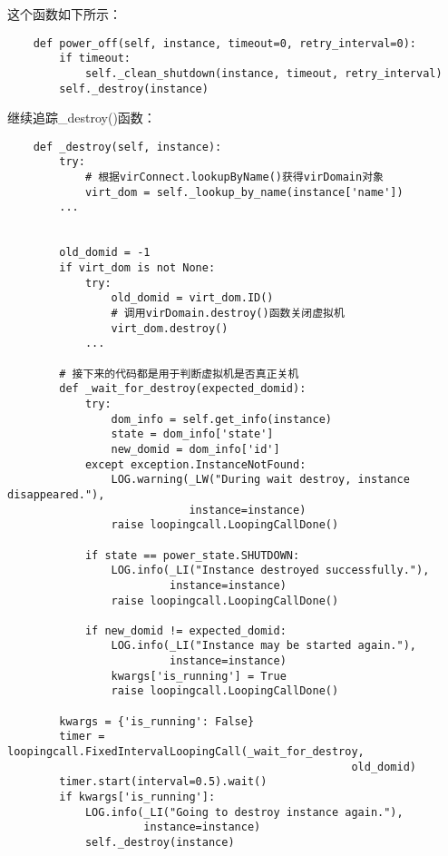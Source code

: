 \documentclass[a4paper,left=1.5cm,right=1.5cm,11pt]{article}
\begin{document}
	这个函数如下所示：
	\begin{lstlisting}
	def power_off(self, instance, timeout=0, retry_interval=0):
        if timeout:
            self._clean_shutdown(instance, timeout, retry_interval)
        self._destroy(instance)
	\end{lstlisting}

	继续追踪\_destroy()函数：
	\begin{lstlisting}
	def _destroy(self, instance):
        try:
			# 根据virConnect.lookupByName()获得virDomain对象
            virt_dom = self._lookup_by_name(instance['name'])
        ...

        
        old_domid = -1
        if virt_dom is not None:
            try:
                old_domid = virt_dom.ID()
				# 调用virDomain.destroy()函数关闭虚拟机
                virt_dom.destroy()
            ...
		
		# 接下来的代码都是用于判断虚拟机是否真正关机
        def _wait_for_destroy(expected_domid):
            try:
                dom_info = self.get_info(instance)
                state = dom_info['state']
                new_domid = dom_info['id']
            except exception.InstanceNotFound:
                LOG.warning(_LW("During wait destroy, instance disappeared."),
                            instance=instance)
                raise loopingcall.LoopingCallDone()

            if state == power_state.SHUTDOWN:
                LOG.info(_LI("Instance destroyed successfully."),
                         instance=instance)
                raise loopingcall.LoopingCallDone()

            if new_domid != expected_domid:
                LOG.info(_LI("Instance may be started again."),
                         instance=instance)
                kwargs['is_running'] = True
                raise loopingcall.LoopingCallDone()

        kwargs = {'is_running': False}
        timer = loopingcall.FixedIntervalLoopingCall(_wait_for_destroy,
                                                     old_domid)
        timer.start(interval=0.5).wait()
        if kwargs['is_running']:
            LOG.info(_LI("Going to destroy instance again."),
                     instance=instance)
            self._destroy(instance)
	\end{lstlisting}
\end{document}
